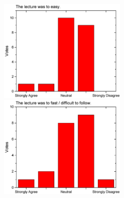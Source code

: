 \begin{figure}[h!]
\begin{minipage}{.48\linewidth}
      {\includegraphics[height=50mm]{figures/n/Graph85.pdf}}
      {\includegraphics[height=50mm]{figures/n/Graph86.pdf}}
  \end{minipage}
\end{figure}

